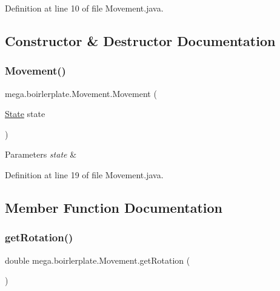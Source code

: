Definition at line 10 of file Movement.\+java.



\subsection{Constructor \& Destructor Documentation}
\mbox{\label{classmega_1_1boirlerplate_1_1_movement_a6ab4e12baf6f275b284f0b90dfa300e1}} 
\subsubsection{\texorpdfstring{Movement()}{Movement()}}
{\footnotesize\ttfamily mega.\+boirlerplate.\+Movement.\+Movement (\begin{DoxyParamCaption}\item[{\hyperlink{classmega_1_1boirlerplate_1_1_state}{State}}]{state }\end{DoxyParamCaption})}


\begin{DoxyParams}{Parameters}
{\em state} & \\
\hline
\end{DoxyParams}


Definition at line 19 of file Movement.\+java.



\subsection{Member Function Documentation}
\mbox{\label{classmega_1_1boirlerplate_1_1_movement_a254357a8df2314189198217027d3d25c}} 
\subsubsection{\texorpdfstring{get\+Rotation()}{getRotation()}}
{\footnotesize\ttfamily double mega.\+boirlerplate.\+Movement.\+get\+Rotation (\begin{DoxyParamCaption}{ }\end{DoxyParamCaption})}

